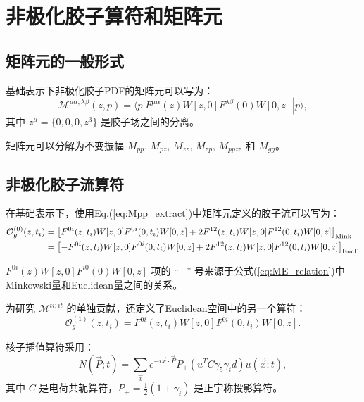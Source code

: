 \documentclass[11pt,a4paper]{article}
\begin{document}
\section{非极化胶子算符和矩阵元}

\subsection{矩阵元的一般形式}

基础表示下非极化胶子PDF的矩阵元可以写为：
\begin{equation}\label{eq:M_general}
    \mathcal{M}^{\mu\alpha;\lambda\beta}(z,p) = \langle p | F^{\mu\alpha}(z) W[z,0] F^{\lambda\beta}(0) W[0,z] | p \rangle,
\end{equation}
其中 $z^\mu = \{0, 0, 0, z^3\}$ 是胶子场之间的分离。

矩阵元可以分解为不变振幅 $M_{pp}$, $M_{pz}$, $M_{zz}$, $M_{zp}$, $M_{ppzz}$ 和 $M_{gg}$\cite{Balitsky:2019krj}。

\subsection{非极化胶子流算符}

在基础表示下，使用Eq.(\ref{eq:Mpp_extract})中矩阵元定义的胶子流可以写为：
\begin{align}
    \mathcal{O}^{(0)}_g(z, t_i) &= \qty[F^{0i}(z, t_i) W[z,0] F^{0i}(0, t_i) W[0,z] + 2F^{12}(z, t_i) W[z,0] F^{12}(0, t_i) W[0,z] ]_{\text{Mink}} \nonumber\\
    &= \qty[-F^{0i}(z, t_i) W[z,0] F^{0i}(0, t_i) W[0,z] + 2F^{12}(z, t_i) W[z,0] F^{12}(0, t_i) W[0,z] ]_{\text{Eucl}}.
\end{align}

$F^{0i}(z) W[z,0] F^{i0}(0) W[0,z]$ 项的 ``$-$'' 号来源于公式(\ref{eq:ME_relation})中Minkowski量和Euclidean量之间的关系。

为研究 $\mathcal{M}^{ti;it}$ 的单独贡献，还定义了Euclidean空间中的另一个算符：
\begin{equation}
    \mathcal{O}^{(1)}_g(z, t_i) = F^{0i}(z, t_i) W[z,0] F^{0i}(0, t_i) W[0,z].
\end{equation}

核子插值算符采用\cite{Egerer:2020xma}：
\begin{equation}\label{eq:N_operator}
    N(\vec{P}; t) = \sum_{\vec{x}} e^{-i\vec{x}\cdot\vec{P}} P_+ (u^T C \gamma_5 \gamma_t d) u(\vec{x}; t),
\end{equation}
其中 $C$ 是电荷共轭算符，$P_+ = \frac{1}{2}(1+\gamma_t)$ 是正宇称投影算符。
\end{document}
